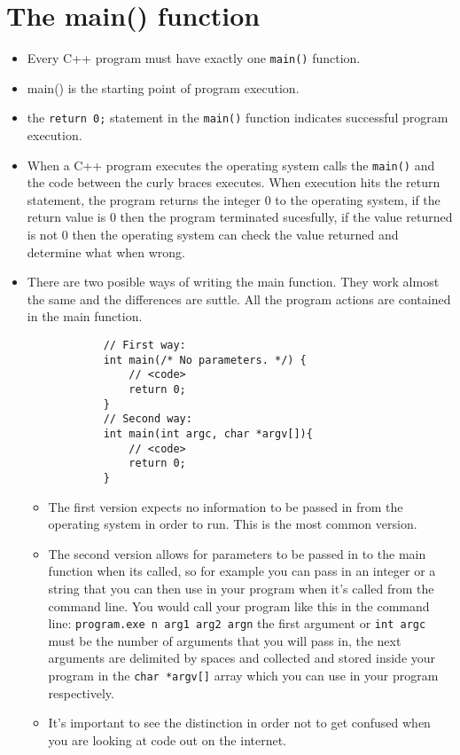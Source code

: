 \section{The main() function}
\begin{itemize}
    \item Every C++ program must have exactly one \texttt{main()} function.
    \item main() is the starting point of program execution.
    \item the \texttt{return 0;} statement in the \texttt{main()} function indicates successful program execution.
    \item When a C++ program executes the operating system calls the \texttt{main()} and the code between the curly braces executes. When execution hits the return statement, the program returns the integer 0 to the operating system, if the return value is 0 then the program terminated sucesfully, if the value returned is not 0 then the operating system can check the value returned and determine what when wrong.
    \item There are two posible ways of writing the main function. They work almost the same and the differences are suttle. All the program actions are contained in the main function.
        \begin{verbatim}
            // First way:
            int main(/* No parameters. */) {
                // <code>
                return 0;
            }
            // Second way:
            int main(int argc, char *argv[]){
                // <code>
                return 0;
            }
        \end{verbatim}
        \begin{itemize}
            \item The first version expects no information to be passed in from the operating system in order to run. This is the most common version.
            \item The second version allows for parameters to be passed in to the main function when its called, so for example you can pass in an integer or a string that you can then use in your program when it's called from the command line. You would call your program like this in the command line: \verb|program.exe n arg1 arg2 argn| the first argument or \texttt{int argc} must be the number of arguments that you will pass in, the next arguments are delimited by spaces and collected and stored inside your program in the \texttt{char *argv[]} array which you can use in your program respectively.
            \item It's important to see the distinction in order not to get confused when you are looking at code out on the internet.
        \end{itemize}
\end{itemize}


